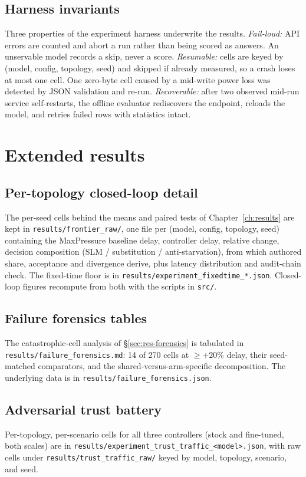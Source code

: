 \section{Harness invariants}
Three properties of the experiment harness underwrite the results.
\emph{Fail-loud:} API errors are counted and abort a run rather than being
scored as answers. An unservable model records a skip, never a score.
\emph{Resumable:} cells are keyed by (model, config, topology, seed) and
skipped if already measured, so a crash loses at most one cell. One
zero-byte cell caused by a mid-write power loss was detected by JSON
validation and re-run.
\emph{Recoverable:} after two observed mid-run service self-restarts, the
offline evaluator rediscovers the endpoint, reloads the model, and retries
failed rows with statistics intact.

\chapter{Extended results}\label{app:tables}

\section{Per-topology closed-loop detail}
The per-seed cells behind the means and paired tests of
Chapter~\ref{ch:results} are kept in
\texttt{results/frontier\_raw/}, one file per (model, config, topology,
seed) containing the MaxPressure baseline delay, controller delay,
relative change, decision composition (SLM / substitution /
anti-starvation), from which authored share, acceptance and divergence
derive, plus latency distribution and audit-chain check. The fixed-time
floor is in \texttt{results/experiment\_fixedtime\_*.json}. Closed-loop
figures recompute from both with the scripts in \texttt{src/}.

\section{Failure forensics tables}
The catastrophic-cell analysis of \S\ref{sec:res-forensics} is tabulated
in \texttt{results/failure\_forensics.md}: 14 of 270 cells at
$\ge{+}20\%$ delay, their seed-matched comparators, and the
shared-versus-arm-specific decomposition. The underlying data is in
\texttt{results/failure\_forensics.json}.

\section{Adversarial trust battery}
Per-topology, per-scenario cells for all three controllers (stock and
fine-tuned, both scales) are in
\texttt{results/\allowbreak experiment\_\allowbreak trust\_\allowbreak traffic\_\allowbreak <model>.json}, with raw cells
under \texttt{results/trust\_traffic\_raw/} keyed by model, topology,
scenario, and seed.


